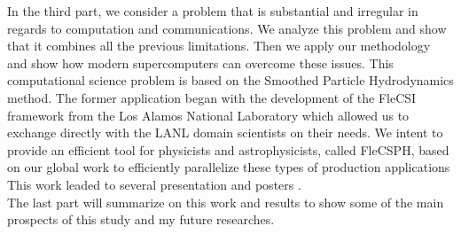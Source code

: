 In the third part, we consider a problem that is substantial and irregular in regards to computation and communications.
We analyze this problem and show that it combines all the previous limitations. 
Then we apply our methodology and show how modern supercomputers can overcome these issues. 
This computational science problem is based on the Smoothed Particle Hydrodynamics method.
The former application began with the development of the FleCSI framework from the Los Alamos National Laboratory which allowed us to exchange directly with the LANL domain scientists on their needs.
We intent to provide an efficient tool for physicists and astrophysicists, called FleCSPH, based on our global work to efficiently parallelize these types of production applications
This work leaded to several presentation and posters \cite{debrye20162HOT,loiseau2017SC}.\\

The last part will summarize on this work and results to show some of the main prospects of this study and my future researches.
